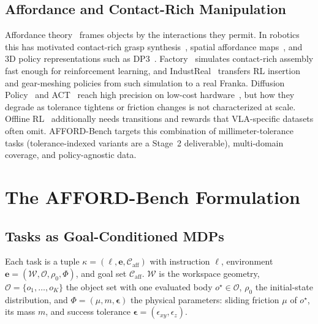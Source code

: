 \documentclass[conference]{IEEEtran}
\begin{document}
\subsection{Affordance and Contact-Rich Manipulation}
Affordance theory~\cite{gibson1979ecological} frames objects by the interactions they permit. In robotics this has motivated contact-rich grasp synthesis~\cite{turpin2022graspd}, spatial affordance maps~\cite{shridhar2022cliport}, and 3D policy representations such as DP3~\cite{ze2024dp3}. Factory~\cite{narang2022factory} simulates contact-rich assembly fast enough for reinforcement learning, and IndustReal~\cite{tang2023industreal} transfers RL insertion and gear-meshing policies from such simulation to a real Franka. Diffusion Policy~\cite{chi2023diffusion} and ACT~\cite{zhao2023act} reach high precision on low-cost hardware~\cite{fu2024mobilealoha}, but how they degrade as tolerance tightens or friction changes is not characterized at scale. Offline RL~\cite{kumar2020cql} additionally needs transitions and rewards that VLA-specific datasets often omit. AFFORD-Bench targets this combination of millimeter-tolerance tasks (tolerance-indexed variants are a Stage~2 deliverable), multi-domain coverage, and policy-agnostic data.

\section{The AFFORD-Bench Formulation}
\label{sec:formulation}
\label{sec:benchmark}

\subsection{Tasks as Goal-Conditioned MDPs}
Each task is a tuple $\kappa = (\ell, \mathbf{e}, \mathcal{C}_{\text{aff}})$ with instruction $\ell$, environment $\mathbf{e} = (\mathcal{W}, \mathcal{O}, \rho_0, \Phi)$, and goal set $\mathcal{C}_{\text{aff}}$. $\mathcal{W}$ is the workspace geometry, $\mathcal{O} = \{o_1, \dots, o_K\}$ the object set with one evaluated body $o^\star \in \mathcal{O}$, $\rho_0$ the initial-state distribution, and $\Phi = (\mu, m, \boldsymbol{\epsilon})$ the physical parameters: sliding friction $\mu$ of $o^\star$, its mass $m$, and success tolerance $\boldsymbol{\epsilon} = (\epsilon_{xy}, \epsilon_z)$.
\end{document}
